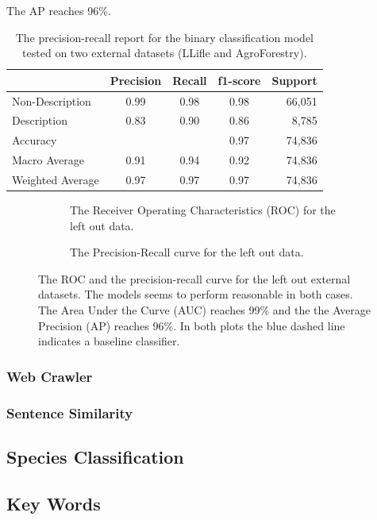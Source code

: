 \documentclass[a4paper, 12pt, oneside]{book} %
\begin{document}
The AP reaches 96\%.
\begin{table}[h]
    \centering
    \caption{The precision-recall report for the binary classification model tested on two external datasets (LLifle and AgroForestry).}
    \label{tab:precision_recall_descriptionsmodel_external}
    \begin{tabular}{@{}lcccr@{}}
    \cmidrule(l){2-5}
     & \multicolumn{1}{l}{Precision} & \multicolumn{1}{l}{Recall} & \multicolumn{1}{l}{f1-score} & \multicolumn{1}{l}{Support} \\ \midrule
    Non-Description  & 0.99 & 0.98 & 0.98 & 66,051 \\
    Description      & 0.83 & 0.90 & 0.86 & 8,785  \\ \midrule
    Accuracy         &      &      & 0.97 & 74,836 \\
    Macro Average    & 0.91 & 0.94 & 0.92 & 74,836 \\
    Weighted Average & 0.97 & 0.97 & 0.97 & 74,836 \\ \bottomrule
    \end{tabular}
\end{table}

\begin{figure} [h]
     \centering
     \begin{subfigure}[b]{0.49\textwidth}
         \centering
         
         \caption{The Receiver Operating Characteristics (ROC) for the left out data.}
         \label{fig:ROC_test_external}
     \end{subfigure}
     \hfill
     \begin{subfigure}[b]{0.49\textwidth}
         \centering
         
         \caption{The Precision-Recall curve for the left out data.}
         \label{fig:precision_recall_curve_test_external}
     \end{subfigure}
     \caption{The ROC and the precision-recall curve for the left out external datasets. The models seems to perform reasonable in both cases. The Area Under the Curve (AUC) reaches 99\% and the the Average Precision (AP) reaches 96\%. In both plots the blue dashed line indicates a baseline classifier.}
\end{figure}

\subsubsection{Web Crawler}

\subsubsection{Sentence Similarity}

\subsection{Species Classification}
\subsection{Key Words}

\printbibliography
\end{document}
